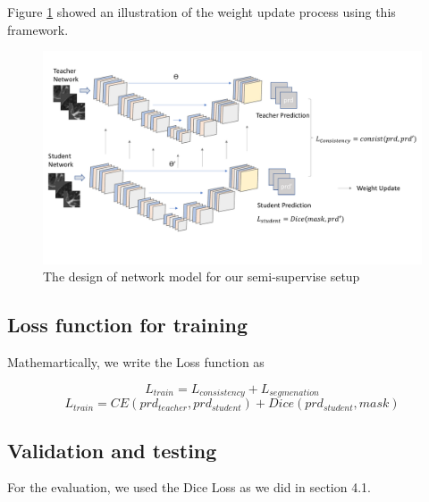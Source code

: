  Figure \ref{fig:mean-teacher-training} showed an illustration of the weight update process using this framework.
\begin{figure}[h]
	\centering
	\includegraphics[width=\textwidth]{img/Networks/mean-teacher-net}
	\caption{The design of network model for our semi-supervise setup}
	\label{fig:mean-teacher-training}
\end{figure}

\subsection{Loss function for training}
Mathemartically, we write the Loss function as

$$L_{train} = L_{consistency} + L_{segmenation}$$
$$L_{train} = CE(prd_{teacher}, prd_{student}) + Dice(prd_{student}, mask) $$
\subsection{Validation and testing}
For the evaluation, we used the Dice Loss as we did in section 4.1.

